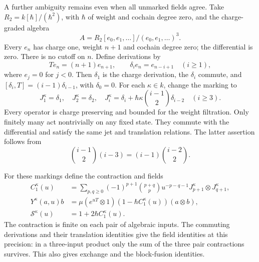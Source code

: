 A further ambiguity remains even when all unmarked fields agree.
Take $R_2=k[\hbar]/(\hbar^2)$, with $\hbar$ of weight and cochain
degree zero, and
the charge-graded algebra
\[
 A=R_2[e_0,e_1,\ldots]/(e_0,e_1,\ldots)^3.
\]
Every $e_n$ has charge one, weight $n+1$ and cochain degree zero;
the differential is zero. There is no cutoff on $n$. Define
derivations by
\[
 Te_n=(n+1)e_{n+1},\qquad
 \delta_i e_n=e_{n-i+1}\quad(i\geq1),
\]
where $e_j=0$ for $j<0$. Then $\delta_1$ is the charge derivation,
the $\delta_i$ commute, and
$[\delta_i,T]=(i-1)\delta_{i-1}$, with $\delta_0=0$.
For each $\kappa\in k$, change the marking to
\begin{equation}\label{cyjets:eq:moment-marking}
 J_1^\kappa=\delta_1,\quad J_2^\kappa=\delta_2,\quad
 J_i^\kappa=\delta_i+
       \hbar\kappa\binom{i-1}{2}\delta_{i-2}\quad(i\geq3).
\end{equation}
Every operator is charge preserving and bounded for the weight
filtration. Only finitely many act nontrivially on any fixed state.
They commute with the differential and satisfy the same jet and
translation relations. The latter assertion follows from
\[
 \binom{i-1}{2}(i-3)=(i-1)\binom{i-2}{2}.
\]

For these markings define the contraction and fields
\begin{align*}
 C_1^\kappa(u)
 &=\sum_{p,q\geq0}(-1)^{p+1}\binom{p+q}{p}
       u^{-p-q-1}J_{p+1}^\kappa\otimes J_{q+1}^\kappa,\\
 Y^\kappa(a,u)b
 &=\mu(e^{uT}\otimes1)(1-\hbar C_1^\kappa(u))(a\otimes b),\\
 \mathcal S^\kappa(u)&=1+2\hbar C_1^\kappa(u).
\end{align*}
The contraction is finite on each pair of algebraic inputs.
The commuting derivations and their translation identities give
the field identities at this precision: in a three-input product
only the sum of the three pair contractions survives. This also
gives exchange and the block-fusion identities.

